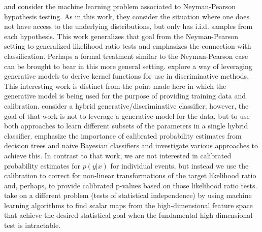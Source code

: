 \documentclass[aoas,preprint]{imsart}
\numberwithin{equation}{section}
\theoremstyle{plain}
\begin{document}
\cite{ClaytonScott} and \cite{JMLR:v14:tong13a} consider the machine learning problem associated to Neyman-Pearson hypothesis testing. As in this work, they consider the situation where one does not have access to the underlying distributions, but only has i.i.d. samples from each hypothesis. This work generalizes that goal from the Neyman-Pearson setting to generalized likelihood ratio tests and emphasizes the connection with classification. Perhaps a  formal treatment similar to the Neyman-Pearson case can be brought to bear in this more general setting.
\cite{TommiJaakkola} explore a way of leveraging generative models to derive kernel functions for use in discriminative methods. This interesting work is distinct from the point made here in which the generative model is being used for the purpose of providing training data and calibration.  \cite{McCallum}
 consider a hybrid generative/discriminative classifier; however, the goal of that work is not to leverage a generative model for the data, but to use both approaches to learn different subsets of the parameters in a single hybrid classifier.  \cite{BiancaZadrozny} emphasize the importance of calibrated probability estimates from decision trees and naive Bayesian classifiers and investigate various approaches to achieve this. In contrast to that work, we are not interested in calibrated probability estimates for $p(y|x)$ for individual events, but instead we use the calibration to correct for non-linear transformations of the target likelihood ratio and, perhaps, to provide calibrated p-values based on those likelihood ratio tests. \cite{Ihler2004} take on a different problem (tests of statistical independence) by using machine learning algorithms to find  scalar maps from the high-dimensional feature space that achieve the desired statistical goal when the fundamental high-dimensional test is intractable.
\end{document}
